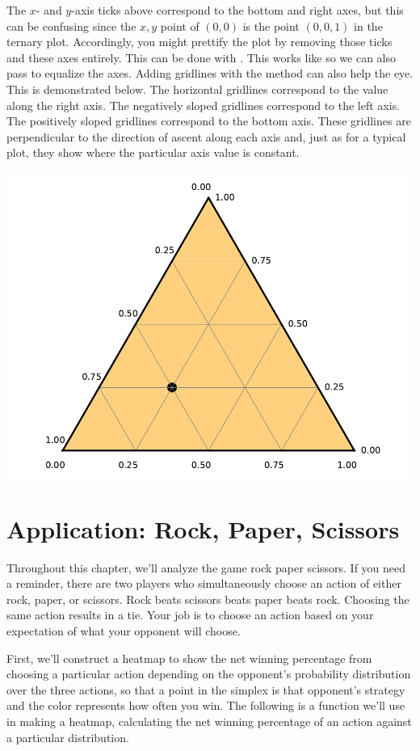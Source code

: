 The $x$- and $y$-axis ticks above correspond to the bottom and right axes, but this can be confusing since the $x,y$ point of $(0,0)$ is the point $(0,0,1)$ in the ternary plot. Accordingly, you might prettify the plot by removing those ticks and these axes entirely. This can be done with . This works like  so we can also pass  to equalize the axes. Adding gridlines with the  method can also help the eye. This is demonstrated below. The horizontal gridlines correspond to the value along the right axis. The negatively sloped gridlines correspond to the left axis. The positively sloped gridlines correspond to the bottom axis. These gridlines are perpendicular to the direction of ascent along each axis and, just as for a typical plot, they show where the particular axis value is constant. 


\begin{center}
    \includegraphics[width = .6\textwidth]{figures/specialplots/grid-ternary.pdf}
\end{center}


\section{Application: Rock, Paper, Scissors}

Throughout this chapter, we'll analyze the game rock paper scissors. If you need a reminder, there are two players who simultaneously choose an action of either rock, paper, or scissors. Rock beats scissors beats paper beats rock. Choosing the same action results in a tie. Your job is to choose an action based on your expectation of what your opponent will choose. 

First, we'll construct a heatmap to show the net winning percentage from choosing a particular action depending on the opponent's probability distribution over the three actions, so that a point in the simplex is that opponent's strategy and the color represents how often you win. The following is a function we'll use in making a heatmap, calculating the net winning percentage of an action against a particular distribution. 

